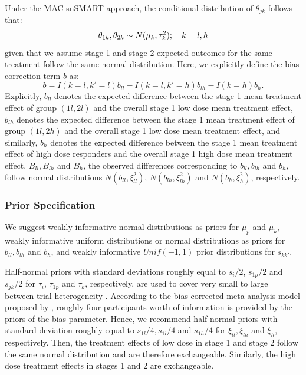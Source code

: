 Under the \ac{MAC}-snSMART approach, the conditional distribution of $\theta_{jk}$ follows that:
\begin{equation}\label{eq:theta}
   \theta_{1k},\theta_{2k} \sim N(\mu_k, \tau_k^2); \quad k = l, h \\
\end{equation}
given that we assume stage 1 and stage 2 expected outcomes for the same treatment follow the same normal distribution. Here, we explicitly define the bias correction term $b$ as:
\begin{equation}
b = I(k = l, k' = l)b_{ll} - I(k = l, k' = h)b_{lh} - I(k = h)b_{h}.
\end{equation}
Explicitly, $b_{ll}$ denotes the expected difference between the stage 1 mean treatment effect of group $(1l, 2l)$ and the overall stage 1 low dose mean treatment effect, $b_{lh}$ denotes the expected difference between the stage 1 mean treatment effect of group $(1l, 2h)$ and the overall stage 1 low dose mean treatment effect, and similarly, $b_h$ denotes the expected difference between the stage 1 mean treatment effect of high dose responders and the overall stage 1 high dose mean treatment effect. $B_{ll}, B_{lh}$ and $B_h$, the observed differences corresponding to $b_{ll}, b_{lh}$ and $b_h$, follow normal distributions $N(b_{ll}, \xi_{ll}^2)$, $N(b_{lh}, \xi_{lh}^2)$ and $N(b_h, \xi_{h}^2)$, respectively. 

\subsubsection{Prior Specification}
We suggest weakly informative normal distributions as priors for $\mu_p$ and $\mu_{k}$, weakly informative uniform distributions or normal distributions as priors for $b_{ll}, b_{lh}$ and $b_h$, and weakly informative $Unif(-1,1)$ prior distributions for $s_{kk'}$.

Half-normal priors with standard deviations roughly equal to $s_i/2$, $s_{1p}/2$ and $s_{jk}/2$ for $\tau_i$, $\tau_{1p}$ and $\tau_k$, respectively, are used to cover very small to large between-trial heterogeneity \citep{spiegelhalter2004bayesian}. According to the bias-corrected meta-analysis model proposed by \cite{verde2021bias}, roughly four participants worth of information is provided by the priors of the bias parameter. Hence, we recommend half-normal priors with standard deviation roughly equal to $s_{1l}/4, s_{1l}/4$ and $s_{1h}/4$ for $\xi_{ll}, \xi_{lh}$ and $\xi_h$, respectively. Then, the treatment effects of low dose in stage 1 and stage 2 follow the same normal distribution and are therefore exchangeable. Similarly, the high dose treatment effects in stages 1 and 2 are exchangeable.

